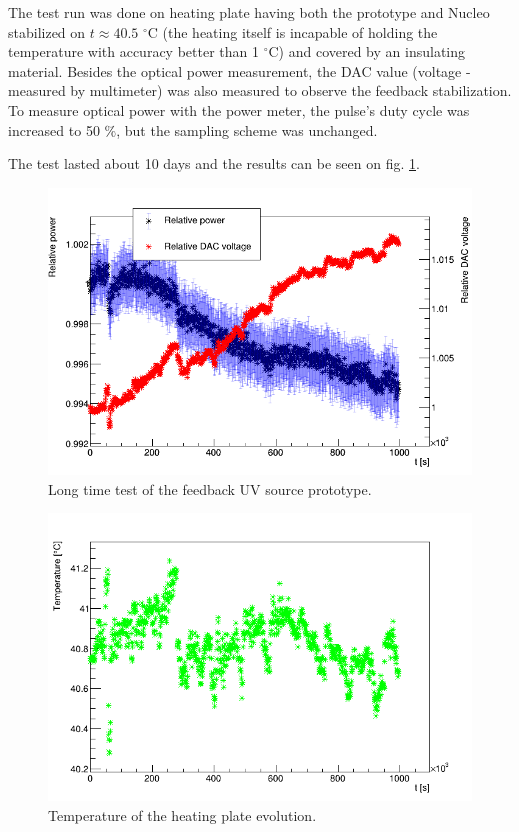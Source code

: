 \par
The test run was done on heating plate having both the prototype and Nucleo stabilized on $t \approx 40.5$ $^\circ $C (the heating itself is incapable of holding the temperature with accuracy better than 1 $^\circ $C) and covered by an insulating material. Besides the optical power measurement, the DAC value (voltage - measured by multimeter) was also measured to observe the feedback stabilization. To measure optical power with the power meter, the pulse's duty cycle was increased to 50 $\%$, but the sampling scheme was unchanged.

\par

The test lasted about 10 days and the results can be seen on fig. \ref{Long test}.


\begin{figure}[H]
 \centering
 \includegraphics[scale=0.5]{./pictures/LongTime.png}
 \caption{Long time test of the feedback UV source prototype.}
 \label{Long test}
\end{figure}

\begin{figure}[H]
 \centering
 \includegraphics[scale=0.5]{./pictures/LastTemp.png}
 \caption{Temperature of the heating plate evolution.}
 \label{Long test temperatures}
\end{figure}

